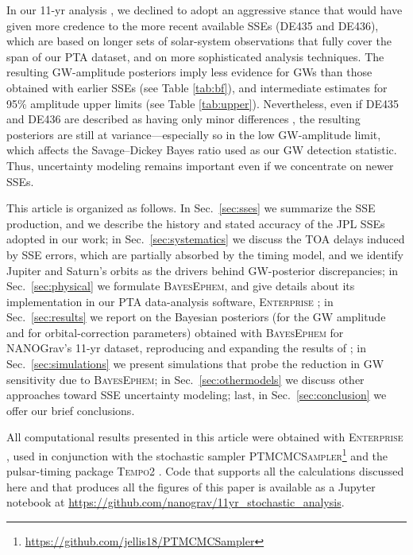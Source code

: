 \documentclass{aastex63}
\begin{document}
In our 11-yr analysis \citep{2018ApJ...859...47A}, we declined to adopt an aggressive stance that would have given more credence to the more recent available SSEs (DE435 and DE436), which are based on longer sets of solar-system observations that fully cover the span of our PTA dataset, and on more sophisticated analysis techniques.
The resulting GW-amplitude posteriors imply less evidence for GWs than those obtained with earlier SSEs (see Table \ref{tab:bf}), and intermediate estimates for 95\% amplitude upper limits (see Table \ref{tab:upper}).
Nevertheless, even if DE435 and DE436 are described as having only minor differences \citep{de435,de436}, the resulting posteriors are still at variance---especially so in the low GW-amplitude limit, which affects the Savage--Dickey Bayes ratio used as our GW detection statistic.
Thus, uncertainty modeling remains important even if we concentrate on newer SSEs.

This article is organized as follows. In Sec.\ \ref{sec:sses} we summarize the SSE production, and we describe the history and stated accuracy of the JPL SSEs adopted in our work; in Sec.\ \ref{sec:systematics} we discuss the TOA delays induced by SSE errors, which are partially absorbed by the timing model, and we identify Jupiter and Saturn's orbits as the drivers behind GW-posterior discrepancies; in Sec.\ \ref{sec:physical} we formulate \textsc{BayesEphem}, and give details about its implementation in our PTA data-analysis software, \textsc{Enterprise} \citep{2019ascl.soft12015E}; in Sec.\ \ref{sec:results} we report on the Bayesian posteriors (for the GW amplitude and for orbital-correction parameters) obtained with \textsc{BayesEphem} for NANOGrav's 11-yr dataset, reproducing and expanding the results of \cite{2018ApJ...859...47A};
in Sec.\ \ref{sec:simulations} we present simulations that probe the reduction in GW sensitivity due to \textsc{BayesEphem};
in Sec.\ \ref{sec:othermodels} we discuss other approaches toward SSE uncertainty modeling;
last, in Sec.\ \ref{sec:conclusion} we offer our brief conclusions.  

All computational results presented in this article were obtained with \textsc{Enterprise}  \citep{2019ascl.soft12015E}, used in conjunction with the stochastic sampler \textsc{PTMCMCSampler}\footnote{\href{https://github.com/jellis18/PTMCMCSampler}{https://github.com/jellis18/PTMCMCSampler}} and the pulsar-timing package \textsc{Tempo2} \citep{2012ascl.soft10015H}.
Code that supports all the calculations discussed here and that produces all the figures of this paper is available as a Jupyter notebook at \url{https://github.com/nanograv/11yr_stochastic_analysis}.
\end{document}
